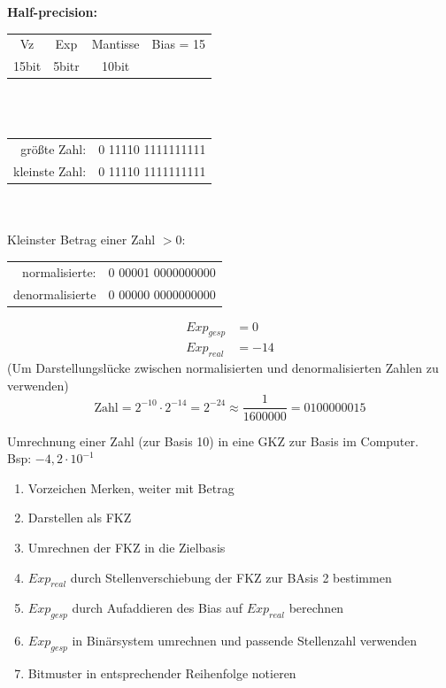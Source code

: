 \documentclass[10pt,a4paper]{scrartcl}
\begin{document}
\textbf{Half-precision:}\\
\begin{tabular}{cccc}
	
	Vz & Exp & Mantisse & Bias = 15\\
	15bit & 5bitr & 10bit &
\end{tabular}
\\
\\
\begin{tabular}{rl}
	größte Zahl: & 0 11110 1111111111\\
kleinste Zahl:   & 0 11110 1111111111\\
\end{tabular}
\\
\\
Kleinster Betrag einer Zahl $ >0 $:\\
\begin{tabular}{rl}
	normalisierte: & 0 00001 0000000000\\
	denormalisierte & 0 00000 0000000000\\
\end{tabular}
\begin{align*}
Exp_{gesp} &= 0\\
Exp_{real} &= -14
\end{align*}
(Um Darstellungslücke zwischen normalisierten und denormalisierten Zahlen zu verwenden)
$$
\text{Zahl} = 2^{-10}\cdot 2^{-14} = 2^{-24} \approx \dfrac{1}{1600000} = 0100000015
$$

Umrechnung einer Zahl (zur Basis 10) in eine \ac{GKZ} zur Basis im Computer.\\
Bsp: $ -4,2 \cdot 10^{-1} $\\
\begin{enumerate}
	\item Vorzeichen Merken, weiter mit Betrag
	\item Darstellen als \ac{FKZ}
	\item Umrechnen der \ac{FKZ} in die Zielbasis
	\item $ Exp_{real} $ durch Stellenverschiebung der \ac{FKZ} zur BAsis 2 bestimmen
	\item $ Exp_{gesp} $ durch Aufaddieren des Bias auf $ Exp_{real} $ berechnen
	\item $ Exp_{gesp} $ in Binärsystem umrechnen und passende Stellenzahl verwenden
	\item Bitmuster in entsprechender Reihenfolge notieren
\end{enumerate}
\end{document}
